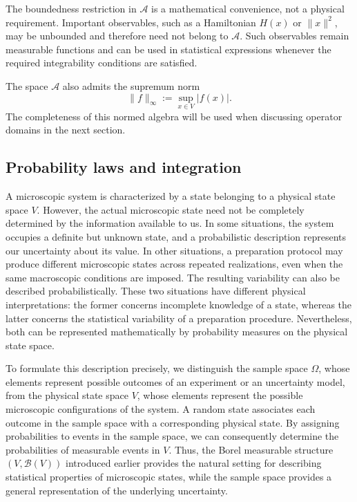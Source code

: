 \documentclass[12pt,a4paper,oneside]{book}
\begin{document}
The boundedness restriction in $\mathcal A$ is a mathematical convenience, not a physical requirement. Important observables,
such as a Hamiltonian $H(x)$ or $\|x\|^2$, may be unbounded and therefore need not belong to $\mathcal A$. Such observables
remain measurable functions and can be used in statistical expressions whenever the required integrability conditions are
satisfied.

The space $\mathcal A$ also admits the supremum norm
\begin{equation*}
    \|f\|_\infty := \sup_{x\in V}|f(x)|.
\end{equation*}
The completeness of this normed algebra will be used when discussing operator domains in the next section.

\subsection{Probability laws and integration}
A microscopic system is characterized by a state belonging to a physical state space $V$. However, the actual microscopic
state need not be completely determined by the information available to us. In some situations, the system occupies a
definite but unknown state, and a probabilistic description represents our uncertainty about its value. In other situations,
a preparation protocol may produce different microscopic states across repeated realizations, even when the same macroscopic
conditions are imposed. The resulting variability can also be described probabilistically. These two situations have
different physical interpretations: the former concerns incomplete knowledge of a state, whereas the latter concerns the
statistical variability of a preparation procedure. Nevertheless, both can be represented mathematically by probability
measures on the physical state space.

To formulate this description precisely, we distinguish the sample space $\Omega$, whose elements represent possible
outcomes of an experiment or an uncertainty model, from the physical state space $V$, whose elements represent the possible
microscopic configurations of the system. A random state associates each outcome in the sample space with a corresponding
physical state. By assigning probabilities to events in the sample space, we can consequently determine the probabilities
of measurable events in $V$. Thus, the Borel measurable structure $(V,\mathcal B(V))$ introduced earlier provides the
natural setting for describing statistical properties of microscopic states, while the sample space provides a general
representation of the underlying uncertainty.
\end{document}
